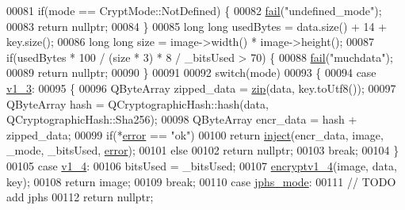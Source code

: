 \begin{DoxyCode}
00081     \textcolor{keywordflow}{if}(mode == CryptMode::NotDefined) \{
00082         \hyperlink{class_model_p_c_a47464b59b7e37fcee25e55475708aabd}{fail}(\textcolor{stringliteral}{"undefined\_mode"});
00083         \textcolor{keywordflow}{return} \textcolor{keyword}{nullptr};
00084     \}
00085     \textcolor{keywordtype}{long} \textcolor{keywordtype}{long} usedBytes = data.size() + 14 + key.size();
00086     \textcolor{keywordtype}{long} \textcolor{keywordtype}{long} size = image->width() * image->height();
00087     \textcolor{keywordflow}{if}(usedBytes * 100 / (size * 3) * 8 / \_bitsUsed > 70) \{
00088         \hyperlink{class_model_p_c_a47464b59b7e37fcee25e55475708aabd}{fail}(\textcolor{stringliteral}{"muchdata"});
00089         \textcolor{keywordflow}{return} \textcolor{keyword}{nullptr};
00090     \}
00091 
00092     \textcolor{keywordflow}{switch}(mode)
00093     \{
00094         \textcolor{keywordflow}{case} \hyperlink{class_model_p_c_a296dd7afe3e1c49b3da25fd644fe4ceba7612e38de7178170655a56ddcf96e12c}{v1\_3}:
00095         \{
00096             QByteArray zipped\_data = \hyperlink{class_model_p_c_afebbbfa4b07deba4f68fc6dfb50f353f}{zip}(data, key.toUtf8());
00097             QByteArray hash = QCryptographicHash::hash(data, QCryptographicHash::Sha256);
00098             QByteArray encr\_data = hash + zipped\_data;
00099             \textcolor{keywordflow}{if}(*\hyperlink{class_model_p_c_a4e5a9c0ca1f06fe5bc478b6bf248c37c}{error} == \textcolor{stringliteral}{"ok"})
00100                 \textcolor{keywordflow}{return} \hyperlink{class_model_p_c_aada6a04d81ada8f2b4ba18108c8d6f10}{inject}(encr\_data, image, \_mode, \_bitsUsed, \hyperlink{class_model_p_c_a4e5a9c0ca1f06fe5bc478b6bf248c37c}{error});
00101             \textcolor{keywordflow}{else}
00102                 \textcolor{keywordflow}{return} \textcolor{keyword}{nullptr};
00103             \textcolor{keywordflow}{break};
00104         \}
00105         \textcolor{keywordflow}{case} \hyperlink{class_model_p_c_a296dd7afe3e1c49b3da25fd644fe4ceba43138df6b33a6b2bf608768907f95abc}{v1\_4}:
00106             bitsUsed = \_bitsUsed;
00107             \hyperlink{class_model_p_c_a4daefc3fb87a1f19172b9b20c987eb12}{encryptv1\_4}(image, data, key);
00108             \textcolor{keywordflow}{return} image;
00109         \textcolor{keywordflow}{break};
00110         \textcolor{keywordflow}{case} \hyperlink{class_model_p_c_a296dd7afe3e1c49b3da25fd644fe4ceba90ca32d3ccbb6be224cdfc33f7096eea}{jphs\_mode}:
00111             \textcolor{comment}{// TODO add jphs}
00112             \textcolor{keywordflow}{return} \textcolor{keyword}{nullptr};

\end{DoxyCode}
